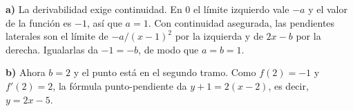 \textbf{a)} La derivabilidad exige continuidad. En $0$ el límite
izquierdo vale $-a$ y el valor de la función es $-1$, así que $a=1$.
Con continuidad asegurada, las pendientes laterales son el límite
de $-a/(x-1)^2$ por la izquierda y de $2x-b$ por la derecha.
Igualarlas da $-1=-b$, de modo que $\boxed{a=b=1}$.

\textbf{b)} Ahora $b=2$ y el punto está en el segundo tramo.
Como $f(2)=-1$ y $f'(2)=2$, la fórmula punto-pendiente da
$y+1=2(x-2)$, es decir, $\boxed{y=2x-5}$.
